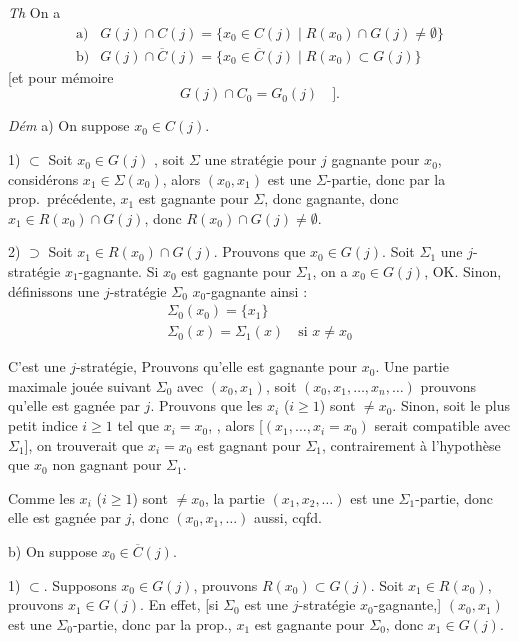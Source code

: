 \documentclass[11pt,a4paper]{article}
\begin{document}
\emph{Th} On a \struck{\ill{}}
\[
\begin{array}{ll}
\text{a)} & G(j) \cap C(j) = \{ x_0 \in C(j) \mid R(x_0) \cap G(j) \neq \emptyset \} \\
\text{b)} & G(j) \cap \overline{C}(j) = \{ x_0 \in \overline{C}(j) \mid R(x_0) \subset G(j) \}
\end{array}
\]
[et pour mémoire
\[
G(j) \cap C_0 = G_0(j) \quad ].
\]

\emph{Dém} a) On suppose $x_0 \in C(j)$.

1) $\subset$ Soit $x_0 \in G(j)$ \struck{\ill{}}, soit $\Sigma$ une stratégie
pour $j$ gagnante pour $x_0$, considérons $x_1 \in \Sigma(x_0)$, alors
$(x_0, x_1)$ est une $\Sigma$-partie, donc par la prop.\ précédente, $x_1$ est
gagnante pour $\Sigma$, donc gagnante, donc $x_1 \in R(x_0) \cap G(j)$, donc
$R(x_0) \cap G(j) \neq \emptyset$.

2) $\supset$ Soit $x_1 \in R(x_0) \cap G(j)$. Prouvons que $x_0 \in G(j)$.
 Soit $\Sigma_1$ une $j$-stratégie $x_1$-gagnante. Si
$x_0$ est gagnante pour $\Sigma_1$, on a $x_0 \in G(j)$, OK. Sinon, définissons
une $j$-stratégie $\Sigma_0$ $x_0$-gagnante ainsi :
\[
\begin{array}{l}
\Sigma_0(x_0) = \{ x_1 \} \\
\Sigma_0(x) = \Sigma_1(x) \quad \text{si } x \neq x_0
\end{array}
\]

C'est une $j$-stratégie,  Prouvons qu'elle est gagnante pour
$x_0$. Une partie maximale jouée suivant $\Sigma_0$  avec
$(x_0, x_1)$, soit $(x_0, x_1, \dots, x_n, \dots)$  prouvons qu'elle est gagnée par
$j$. Prouvons  que les $x_i$ ($i \geq 1$) sont $\neq x_0$.
Sinon,  soit le plus petit indice $i \geq 1$ tel que
$x_i = x_0$, , alors  [$(x_1, \dots, x_i = x_0)$ serait compatible avec $\Sigma_1$],
on trouverait que $x_i = x_0$ est gagnant pour $\Sigma_1$, contrairement à
l'hypothèse que $x_0$ non gagnant pour $\Sigma_1$.

Comme les $x_i$ ($i \geq 1$) sont $\neq x_0$, la partie $(x_1, x_2, \dots)$
est une $\Sigma_1$-partie, donc elle est gagnée par $j$, donc
$(x_0, x_1, \dots)$ aussi, cqfd.

b) On suppose $x_0 \in \overline{C}(j)$.

1) $\subset$. Supposons $x_0 \in G(j)$, prouvons $R(x_0) \subset G(j)$. Soit
$x_1 \in R(x_0)$, prouvons $x_1 \in G(j)$. En effet, [si $\Sigma_0$ est une
$j$-stratégie $x_0$-gagnante,] $(x_0, x_1)$ est une $\Sigma_0$-partie, donc
par la prop., $x_1$ est gagnante pour $\Sigma_0$, donc $x_1 \in G(j)$.
\end{document}
